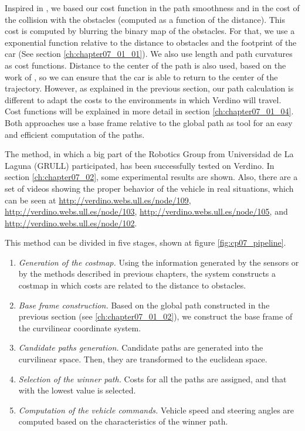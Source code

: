 Inspired in \cite{chu2012local}, we based our cost function in the path smoothness and in the cost of the collision with the obstacles (computed as a function of the distance). This cost is computed by blurring the binary map of the obstacles. For that, we use a exponential function relative to the distance to obstacles and the footprint of the car (See section \ref{ch:chapter07_01_01}).
We also use length and path curvatures as cost functions. Distance to the center of the path is also used, based on the work of \cite{thrun2006stanley}, so we can ensure that the car is able to return to the center of the trajectory. However, as explained in the previous section, our path calculation is different to adapt the costs to the environments in which Verdino will travel. Cost functions will be explained in more detail in section \ref{ch:chapter07_01_04}. Both approaches \citep{chu2012local, thrun2006stanley} use a base frame relative to the global path as tool for an easy and efficient computation of the paths.

The method, in which a big part of the Robotics Group from Universidad de La Laguna (GRULL) participated, has been successfully tested on Verdino. In section \ref{ch:chapter07_02}, some experimental results are shown. Also, there are a set of videos showing the proper behavior of the vehicle in real situations, which can be seen at \url{http://verdino.webs.ull.es/node/109}, \url{http://verdino.webs.ull.es/node/103}, \url{http://verdino.webs.ull.es/node/105}, and \url{http://verdino.webs.ull.es/node/102}.

This method can be divided in five stages, shown at figure \ref{fig:cp07_pipeline}.
\begin{enumerate}
 \item \emph{Generation of the costmap.} Using the information generated by the sensors or by the methods described in previous chapters, the system constructs a costmap in which costs are related to the distance to obstacles.
 \item \emph{Base frame construction.} Based on the global path constructed in the previous section (see \ref{ch:chapter07_01_02}), we construct the base frame of the curvilinear coordinate system.
 \item \emph{Candidate paths generation.} Candidate paths are generated into the curvilinear space. Then, they are transformed to the euclidean space.
 \item \emph{Selection of the winner path.} Costs for all the paths are assigned, and that with the lowest value is selected.
 \item \emph{Computation of the vehicle commands.} Vehicle speed and steering angles are computed based on the characteristics of the winner path.
\end{enumerate}

